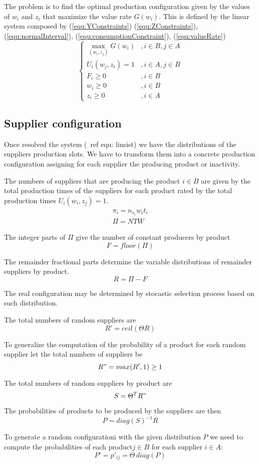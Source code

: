 \documentclass[a4paper,11pt]{article}
\begin{document}
The problem is to find the optimal production configuration given by the
values of $ w_i $ and $ z_i $ that maximize the value rate $ G(w_i) $.
This is defined by the linear system composed by
(\ref{equ:YConstraints})
(\ref{equ:ZConstraints}),
(\ref{equ:normalInterval}),
(\ref{equ:consumptionConstraint}),
(\ref{equ:valueRate})
\begin{equation}
\label{equ:linsist}
\left\{
\begin{array}{ll}
\max_{(w_i, z_j)} G(w_i) & , i \in B, j \in A \\
U_i(w_j, z_i) = 1 &  , i \in A, j \in B \\
F_i \ge 0 & , i \in B \\
w_i \ge 0 & , i \in B \\
z_i \ge 0 & , i \in A
\end{array}
\right.
\end{equation}


\subsection{Supplier configuration}

Once resolved the system (\ ref {equ: linsist}) we have the distributions of the suppliers production slots.
We have to transform them into a concrete production configuration assigning for each supplier the producing product or inactivity.

The numbers of suppliers that are producing the product $ i \in B $  are given by the total production times of the suppliers for each product rated by the total production times $ U_i(w_i, z_j) = 1 $.
\[
\begin{array}{l}
	\pi_i = n_{s_i} w_i t_i \\
	\Pi = N T W
\end{array}
\]

The integer parts of $ \Pi $ give the number of constant producers by product
\[
	F = floor(\Pi)
\]

The remainder fractional parts determine the variable distributions of remainder suppliers by product.
\[
	R = \Pi - F
\]

The real configuration may be determined by stocastic selection process based on such distribution.

The total numbers of random suppliers are
\[
	R' = ceil(\Theta R)
\]

To generalize the computation of the probability of a product for each random supplier let the total numbers of suppliers be  \[
	R" = max(R', 1) \ge 1
\]

The total numbers of random suppliers by product are
\[
	S = \Theta^T R"
\]

The probabilities of products to be produced by the suppliers are then
\[
	P = diag(S)^{-1} R
\]

To generate a random configurationi with the given distribution $ P $ we need to compute the probabilities of each product$ j \in B $ for each supplier $ i \in A $:
\[
	P' = p'_{ij} = \Theta \, diag(P)
\]
\end{document}
